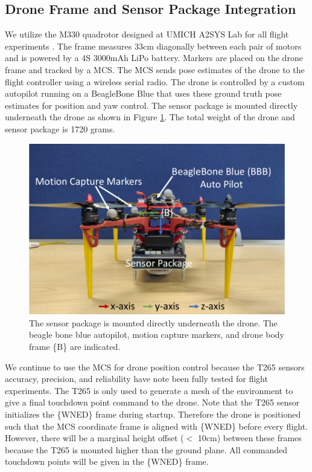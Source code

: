 \subsection{Drone Frame and Sensor Package Integration}

We utilize the M330 quadrotor designed at UMICH A2SYS Lab for all flight experiments \cite{romano_experimental_2019}. The frame measures 33cm diagonally between each pair of motors and is powered by a 4S 3000mAh LiPo battery. Markers are placed on the drone frame and tracked by a \ac{MCS}. The \ac{MCS} sends pose estimates of the drone to the flight controller using a wireless serial radio. The drone is controlled by a custom autopilot running on a BeagleBone Blue that uses these ground truth pose estimates for position and yaw control. The sensor package is mounted directly underneath the drone as shown in Figure \ref{fig:ch7_drone_frame}. The total weight of the drone and sensor package is 1720 grams.

\begin{figure}[!htb]
  \centering
  \includegraphics[page=1,clip,trim=0cm 0cm 0cm 0cm,width=.50\linewidth]{chapter_7_experiments/imgs/drone_with_sensor_package.pdf}
  \caption[Sensor Package Mounted Underneath Drone]{The sensor package is mounted directly underneath the drone. The beagle bone blue autopilot, motion capture markers, and drone body frame \{B\} are indicated.}\label{fig:ch7_drone_frame}
\end{figure}

We continue to use the \ac{MCS} for drone position control because the T265 sensors accuracy, precision, and reliability have note been fully tested for flight experiments. The T265 is only used to generate a mesh of the environment to give a final touchdown point command to the drone. Note that the T265 sensor initializes the \{WNED\} frame during startup. Therefore the drone is positioned such that the \ac{MCS} coordinate frame is aligned with \{WNED\} before every flight. However, there will be a marginal height offset ($<$ 10cm) between these frames because the T265 is mounted higher than the ground plane. All commanded touchdown points will be given in the \{WNED\} frame.

